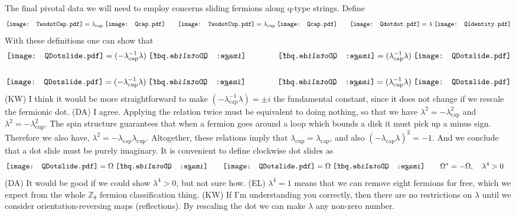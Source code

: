 \documentclass[12pt,a4paper]{article}
\newcommand{\zz}{\mathbb{Z}}
\newcommand{\dave}[1]{{\color{ao(english)}\footnotesize{(DA) #1}}}
\newcommand{\ethan}[1]{{\color{amethyst}\footnotesize{(EL) #1}}}
\newcommand{\kw}[1]{{\color{kwcolor}\footnotesize{(KW) #1}}}
\newcommand{\Qcap}{\mathord{\vcenter{\hbox{\texttt{[image: Qcap.pdf]}}}}}
\newcommand{\Qcup}{\mathord{\vcenter{\hbox{\texttt{[image: Qcap.pdf]}}}}}
\newcommand{\Qdotdot}{\mathord{\vcenter{\hbox{\texttt{[image: Qdotdot.pdf]}}}}}
\newcommand{\QIdentity}{\mathord{\vcenter{\hbox{\texttt{[image: QIdentity.pdf]}}}}}
\newcommand{\QCapDotL}{\mathord{\vcenter{\hbox{\texttt{[image: QDotslide.pdf]}}}}}
\newcommand{\QCupDotR}{\mathord{\vcenter{\hbox{\texttt{[image: QDotslide.pdf]}}}}}
\newcommand{\QCapDotR}{\mathord{\vcenter{\hbox{\reflectbox{\texttt{[image: QDotslide.pdf]}}}}}}
\newcommand{\QCupDotL}{\mathord{\vcenter{\hbox{\reflectbox{\texttt{[image: QDotslide.pdf]}}}}}}
\newcommand{\TwodotCap}{\mathord{\vcenter{\hbox{\texttt{[image: TwodotCap.pdf]}}}}}
\newcommand{\TwodotCup}{\mathord{\vcenter{\hbox{\texttt{[image: TwodotCup.pdf]}}}}}
\begin{document}
The final pivotal data we will need to employ concerns sliding fermions along q-type strings. 
Define 
\begin{align}
\TwodotCap =  \lambda_{\text{cap}} \; \Qcap \quad \quad
\TwodotCup =  \lambda_{\text{cup}}\; \Qcup \quad \quad
\Qdotdot =  \lambda \; \QIdentity
\end{align}
With these definitions one can show that
\begin{align}
\QCapDotL =(-\lambda_{\text{cap}}^{-1} \lambda )\; \QCapDotR \qquad \qquad \QCapDotR  = (\lambda_{\text{cap}}^{-1} \lambda ) \; \QCapDotL\\ 
\\
\QCupDotR= (-\lambda_{\text{cup}}^{-1} \lambda )\; \QCupDotL \qquad \qquad \QCupDotL  = (\lambda_{\text{cup}}^{-1} \lambda) \; \QCupDotR
\end{align}
\kw{I think it would be more straightforward to make $(-\lambda_{\text{cap}}^{-1} \lambda ) = \pm i$ the fundamental constant,
since it does not change if we rescale the fermionic dot.}
\dave{I agree.}
Applying the relation twice must be equivalent to doing nothing, so that we have $\lambda^2 = -\lambda_{\text{cap}}^2$ and $\lambda^2 = -\lambda_{\text{cup}}^2$.
The spin structure guarantees that when a fermion goes around a loop which bounds a disk it must pick up a minus sign. 
Therefore we also have, $\lambda^2 = -\lambda_{\text{cap}} \lambda_{\text{cup}}$.
Altogether, these relations imply that $\lambda_{\text{cup}} = \lambda_{\text{cap}}$, and also $(-\lambda_{\text{cap}} \lambda)^2 = -1$.
And we conclude that a dot slide must be purely imaginary. It is convenient to define clockwise dot slides as
\begin{align}
&\QCapDotL =\Omega \; \QCapDotR \quad \quad \QCupDotR= \Omega \; \QCupDotL \quad \quad \Omega^* = -\Omega, \quad \lambda^4 >0
\end{align}
\dave{It would be good if we could show $\lambda^4>0$, but not sure how.} \ethan{$\lambda^4=1$ means that we can remove eight fermions for free, which we expect from the whole $\zz_8$ fermion classification thing.}
\kw{If I'm understanding you correctly, then there are no restrictions on $\lambda$ until we consider orientation-reversing maps (reflections).
By rescaling the dot we can make $\lambda$ any non-zero number.}
\end{document}
